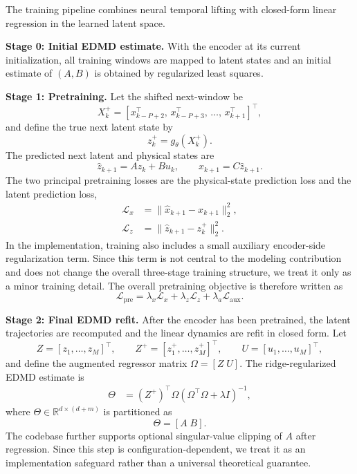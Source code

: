 \documentclass[journal]{IEEEtran}
\begin{document}
The training pipeline combines neural temporal lifting with closed-form linear regression in the learned latent space.

\textbf{Stage 0: Initial EDMD estimate.} With the encoder at its current initialization, all training windows are mapped to latent states and an initial estimate of $(A,B)$ is obtained by regularized least squares.

\textbf{Stage 1: Pretraining.} Let the shifted next-window be
\begin{equation}
    X_k^{+} = [x_{k-P+2}^\top,\,x_{k-P+3}^\top,\,\ldots,\,x_{k+1}^\top]^\top,
\end{equation}
and define the true next latent state by
\begin{equation}
    z_k^{+} = g_\theta(X_k^{+}).
\end{equation}
The predicted next latent and physical states are
\begin{equation}
    \hat{z}_{k+1} = Az_k + Bu_k,
    \qquad
    \hat{x}_{k+1} = C\hat{z}_{k+1}.
\end{equation}
The two principal pretraining losses are the physical-state prediction loss and the latent prediction loss,
\begin{align}
    \mathcal{L}_{x} &= \|\hat{x}_{k+1}-x_{k+1}\|_2^2,
    \\
    \mathcal{L}_{z} &= \|\hat{z}_{k+1}-z_k^{+}\|_2^2.
\end{align}
In the implementation, training also includes a small auxiliary encoder-side regularization term. Since this term is not central to the modeling contribution and does not change the overall three-stage training structure, we treat it only as a minor training detail. The overall pretraining objective is therefore written as
\begin{equation}
    \mathcal{L}_{\mathrm{pre}} = \lambda_x\mathcal{L}_x + \lambda_z\mathcal{L}_z + \lambda_a\mathcal{L}_{\mathrm{aux}}.
    \label{eq:pretraining_loss}
\end{equation}

\textbf{Stage 2: Final EDMD refit.} After the encoder has been pretrained, the latent trajectories are recomputed and the linear dynamics are refit in closed form. Let
\begin{equation}
    Z=[z_1,\ldots,z_M]^\top,
    \qquad
    Z^{+}=[z_1^{+},\ldots,z_M^{+}]^\top,
    \qquad
    U=[u_1,\ldots,u_M]^\top,
\end{equation}
and define the augmented regressor matrix $\Omega=[Z\;U]$. The ridge-regularized EDMD estimate is
\begin{equation}
\begin{aligned}
    \Theta &= (Z^{+})^\top \Omega
    \left(\Omega^\top\Omega + \lambda I\right)^{-1},
\end{aligned}
    \label{eq:edmd_solution}
\end{equation}
where $\Theta \in \mathbb{R}^{d\times(d+m)}$ is partitioned as
\begin{equation}
    \Theta = [A\;B].
\end{equation}
The codebase further supports optional singular-value clipping of $A$ after regression. Since this step is configuration-dependent, we treat it as an implementation safeguard rather than a universal theoretical guarantee.
\end{document}
